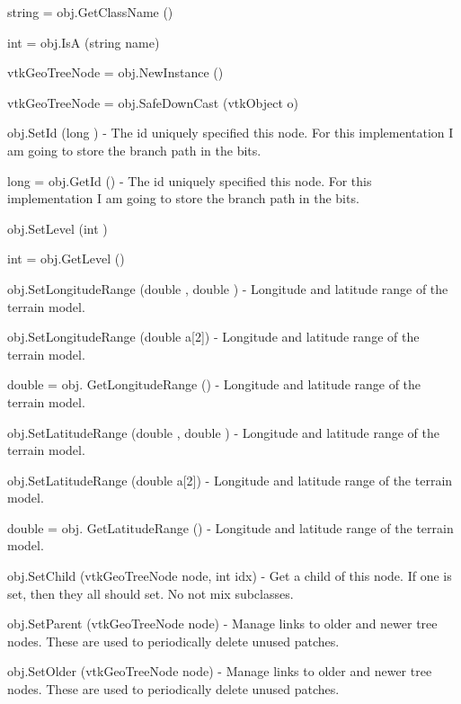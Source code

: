 \begin{DoxyItemize}
\item {\ttfamily string = obj.\-Get\-Class\-Name ()}  
\item {\ttfamily int = obj.\-Is\-A (string name)}  
\item {\ttfamily vtk\-Geo\-Tree\-Node = obj.\-New\-Instance ()}  
\item {\ttfamily vtk\-Geo\-Tree\-Node = obj.\-Safe\-Down\-Cast (vtk\-Object o)}  
\item {\ttfamily obj.\-Set\-Id (long )} -\/ The id uniquely specified this node. For this implementation I am going to store the branch path in the bits.  
\item {\ttfamily long = obj.\-Get\-Id ()} -\/ The id uniquely specified this node. For this implementation I am going to store the branch path in the bits.  
\item {\ttfamily obj.\-Set\-Level (int )}  
\item {\ttfamily int = obj.\-Get\-Level ()}  
\item {\ttfamily obj.\-Set\-Longitude\-Range (double , double )} -\/ Longitude and latitude range of the terrain model.  
\item {\ttfamily obj.\-Set\-Longitude\-Range (double a\mbox{[}2\mbox{]})} -\/ Longitude and latitude range of the terrain model.  
\item {\ttfamily double = obj. Get\-Longitude\-Range ()} -\/ Longitude and latitude range of the terrain model.  
\item {\ttfamily obj.\-Set\-Latitude\-Range (double , double )} -\/ Longitude and latitude range of the terrain model.  
\item {\ttfamily obj.\-Set\-Latitude\-Range (double a\mbox{[}2\mbox{]})} -\/ Longitude and latitude range of the terrain model.  
\item {\ttfamily double = obj. Get\-Latitude\-Range ()} -\/ Longitude and latitude range of the terrain model.  
\item {\ttfamily obj.\-Set\-Child (vtk\-Geo\-Tree\-Node node, int idx)} -\/ Get a child of this node. If one is set, then they all should set. No not mix subclasses.  
\item {\ttfamily obj.\-Set\-Parent (vtk\-Geo\-Tree\-Node node)} -\/ Manage links to older and newer tree nodes. These are used to periodically delete unused patches.  
\item {\ttfamily obj.\-Set\-Older (vtk\-Geo\-Tree\-Node node)} -\/ Manage links to older and newer tree nodes. These are used to periodically delete unused patches.  

\end{DoxyItemize}
